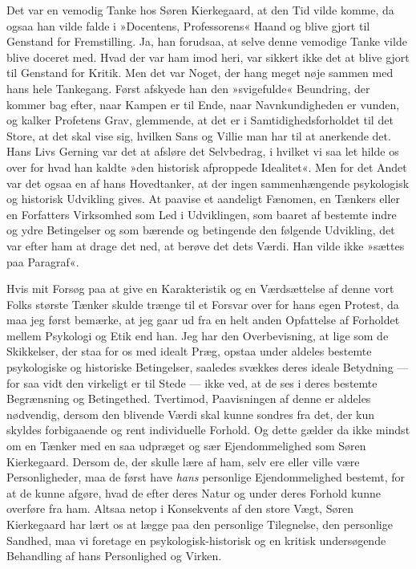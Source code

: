 \documentclass[12pt,a4paper,openany]{book}
\newcommand{\opage}[1]{\marginnote{\footnotesize\textit{[#1]}}}
\begin{document}
Det var en vemodig Tanke hos Søren Kierkegaard,
at den Tid vilde komme, da ogsaa han vilde falde i
»Docentens, Professorens« Haand og blive gjort til Genstand
for Fremstilling. Ja, han forudsaa, at selve denne
vemodige Tanke vilde blive doceret med. Hvad der var
ham imod heri, var sikkert ikke det at blive gjort til
Genstand for Kritik. Men det var Noget, der hang
meget nøje sammen med hans hele Tankegang. Først
afskyede han den »svigefulde« Beundring, der kommer
bag efter, naar Kampen er til Ende, naar Navnkundigheden
er vunden, og kalker Profetens Grav, glemmende,
at det er i Samtidighedsforholdet til det Store, at det
skal vise sig, hvilken Sans og Villie man har til at anerkende
det. Hans Livs Gerning var det at afsløre det
Selvbedrag, i hvilket vi saa let hilde os over for hvad
han kaldte »den historisk afproppede Idealitet«. Men for
det Andet var det ogsaa en af hans Hovedtanker, at der
ingen sammenhængende psykologisk og historisk Udvikling
gives. At paavise et aandeligt Fænomen, en Tænkers
eller en Forfatters Virksomhed som Led i Udviklingen,
som baaret af bestemte indre og ydre Betingelser og som
bærende og betingende den følgende Udvikling, det var
efter ham at drage det ned, at berøve det dets Værdi.
Han vilde ikke »sættes paa Paragraf«.

\opage{2}Hvis mit Forsøg paa at give en Karakteristik og
en Værdsættelse af denne vort Folks største Tænker
skulde trænge til et Forsvar over for hans egen Protest,
da maa jeg først bemærke, at jeg gaar ud fra en helt
anden Opfattelse af Forholdet mellem Psykologi og Etik
end han. Jeg har den Overbevisning, at lige som de
Skikkelser, der staa for os med idealt Præg, opstaa under
aldeles bestemte psykologiske og historiske Betingelser,
saaledes svækkes deres ideale Betydning --- for saa vidt
den virkeligt er til Stede --- ikke ved, at de ses i deres
bestemte Begrænsning og Betingethed. Tvertimod, Paavisningen
af denne er aldeles nødvendig, dersom den
blivende Værdi skal kunne sondres fra det, der kun
skyldes forbigaaende og rent individuelle Forhold. Og
dette gælder da ikke mindst om en Tænker med en saa
udpræget og sær Ejendommelighed som Søren Kierkegaard.
Dersom de, der skulle lære af ham, selv ere
eller ville være Personligheder, maa de først have \textit{hans}
personlige Ejendommelighed bestemt, for at de kunne afgøre,
hvad de efter deres Natur og under deres Forhold
kunne overføre fra ham. Altsaa netop i Konsekvents af
den store Vægt, Søren Kierkegaard har lært os at
lægge paa den personlige Tilegnelse, den personlige Sandhed,
maa vi foretage en psykologisk-historisk og en kritisk
undersøgende Behandling af hans Personlighed og
Virken.
\end{document}
